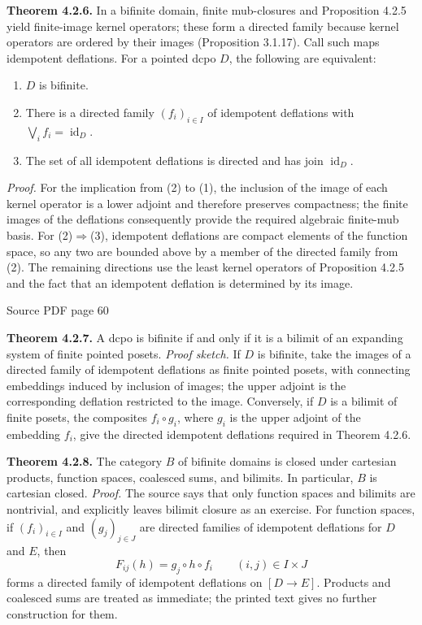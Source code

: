\documentclass[11pt]{article}
\newcommand{\leanmarker}[2]{%
  \Needspace{3\baselineskip}%
  \marginnote{\hyperlink{#1}{\color{LeanTeal}\fbox{\scriptsize Lean}}}%
  \hypertarget{#1}{\textbf{#2.}}%
}
\newcommand{\sourcepage}[1]{\par\medskip\noindent\textcolor{SourceGray}{\scriptsize Source PDF page #1}\par\smallskip}
\begin{document}
\leanmarker{thm-4-2-6}{Theorem 4.2.6} In a bifinite domain, finite mub-closures and Proposition 4.2.5 yield finite-image kernel operators; these form a directed family because kernel operators are ordered by their images (Proposition 3.1.17). Call such maps idempotent deflations. For a pointed dcpo $D$, the following are equivalent:
\begin{enumerate}
\item $D$ is bifinite.
\item There is a directed family $(f_i)_{i\in I}$ of idempotent deflations with $\bigvee_i f_i=\operatorname{id}_D$.
\item The set of all idempotent deflations is directed and has join $\operatorname{id}_D$.
\end{enumerate}
\textit{Proof.} For the implication from (2) to (1), the inclusion of the image of each kernel operator is a lower adjoint and therefore preserves compactness; the finite images of the deflations consequently provide the required algebraic finite-mub basis. For (2)$\Rightarrow$(3), idempotent deflations are compact elements of the function space, so any two are bounded above by a member of the directed family from (2). The remaining directions use the least kernel operators of Proposition 4.2.5 and the fact that an idempotent deflation is determined by its image.

\sourcepage{60}
\leanmarker{thm-4-2-7}{Theorem 4.2.7} A dcpo is bifinite if and only if it is a bilimit of an expanding system of finite pointed posets.
\textit{Proof sketch.} If \(D\) is bifinite, take the images of a directed family of idempotent deflations as finite pointed posets, with connecting embeddings induced by inclusion of images; the upper adjoint is the corresponding deflation restricted to the image. Conversely, if \(D\) is a bilimit of finite posets, the composites \(f_i\circ g_i\), where \(g_i\) is the upper adjoint of the embedding \(f_i\), give the directed idempotent deflations required in Theorem 4.2.6.

\leanmarker{thm-4-2-8}{Theorem 4.2.8} The category $B$ of bifinite domains is closed under cartesian products, function spaces, coalesced sums, and bilimits. In particular, $B$ is cartesian closed.
\textit{Proof.} The source says that only function spaces and bilimits are nontrivial, and explicitly leaves bilimit closure as an exercise. For function spaces, if \((f_i)_{i\in I}\) and \((g_j)_{j\in J}\) are directed families of idempotent deflations for \(D\) and \(E\), then
\[
  F_{ij}(h)=g_j\circ h\circ f_i\qquad (i,j)\in I\times J
\]
forms a directed family of idempotent deflations on \([D\to E]\). Products and coalesced sums are treated as immediate; the printed text gives no further construction for them.
\end{document}
